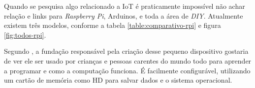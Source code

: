 \documentclass[
	12pt,				%
	openright,			%
	oneside,			%
	a4paper,			%
	chapter=TITLE,		%
	english,			%
	brazil				%
	]{abntex2}
\begin{document}
{Quando se pesquisa algo relacionado a IoT é praticamente impossível não achar relação e links para \textit{Raspberry Pi}, Arduinos, e toda a área de \textit{DIY}. Atualmente existem três modelos, conforme a tabela \autoref{table:comparativo-rpi} e figura \autoref{fig:todos-rpi}. 

\begin{figure}[htb]
\end{figure}

\begin{table}[htb]
\end{table}

Segundo , a fundação responsável pela criação desse pequeno dispositivo gostaria de ver ele ser usado por crianças e pessoas carentes do mundo todo para aprender a programar e como a computação funciona. É facilmente configurável, utilizando um cartão de memória como HD para salvar dados e o sistema operacional.

}
\end{document}
